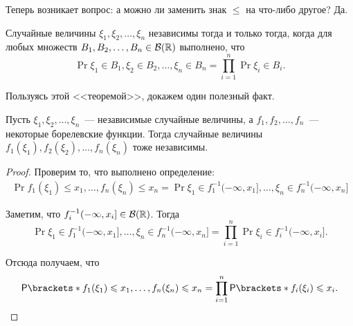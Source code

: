 Теперь возникает вопрос: а можно ли заменить знак \(\leq\) на что-либо другое? Да.
\begin{theorem}
	Случайные величины \(\xi_1, \xi_2, \dots, \xi_n\) независимы тогда и только тогда, когда для любых множеств \(B_1, B_2, \dots, B_n \in \mathcal{B}(\mathbb{R})\) выполнено, что
	\[
	\Pr{\xi_1 \in B_1, \xi_2 \in B_2, \dots, \xi_n \in B_n} = \prod\limits_{i = 1}^{n} \Pr{\xi_i \in B_i}.
	\]
\end{theorem}

Пользуясь этой <<теоремой>>, докажем один полезный факт.
\begin{lemma}
	Пусть \(\xi_1, \xi_2, \dots, \xi_n\)~--- независимые случайные величины, а \(f_1, f_2, \dots, f_n\)~--- некоторые борелевские функции. Тогда случайные величины \(f_1(\xi_1), f_2(\xi_2), \dots, f_n(\xi_n)\) тоже независимы.
\end{lemma}
\begin{proof}
	Проверим то, что выполнено определение:
	\begin{align}
		\Pr{f_1(\xi_1) \leq x_1, \dots, f_n(\xi_n) \leq x_n} = \Pr{\xi_1 \in f_{1}^{-1}(-\infty, x_1], \dots, \xi_n \in f_{n}^{-1}(-\infty, x_n]}
	\end{align}
	
	Заметим, что \(f_{i}^{-1}(-\infty, x_i] \in \mathcal{B}(\mathbb{R})\). Тогда
	\[
	\Pr{\xi_1 \in f_{1}^{-1}(-\infty, x_1], \dots, \xi_n \in f_{n}^{-1}(-\infty, x_n]} = \prod\limits_{i = 1}^{n} \Pr{\xi_i \in f_{i}^{-1}(-\infty, x_i]}.
	\]
	
	Отсюда получаем, что
	\[
	\Pr{f_1(\xi_1) \leq x_1, \dots, f_n(\xi_n) \leq x_n}  = \prod\limits_{i = 1}^{n} \Pr{f_{i}(\xi_i) \leq x_i}. \qedhere
	\]
\end{proof}

